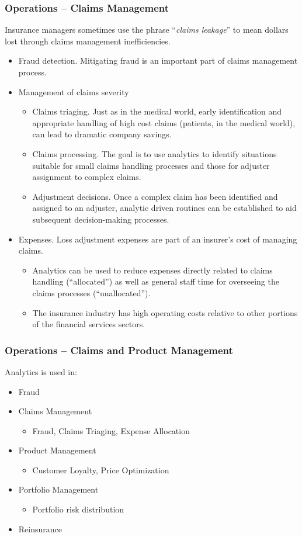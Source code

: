 \documentclass[serif,10pt]{beamer}
\begin{document}
\begin{frame}[shrink=2]
\frametitle{Operations -- Claims Management}
Insurance managers sometimes use the phrase ``\textit{claims leakage}'' to mean dollars lost through claims management inefficiencies.
\begin{itemize}
\item Fraud detection. Mitigating fraud is an important part of claims management process.
\item Management of claims severity
\begin{itemize}
\item Claims triaging. Just as in the medical world, early identification and appropriate handling of high cost claims (patients, in the medical world), can lead to dramatic company savings.
\item Claims processing. The goal is to use analytics to identify situations suitable for small claims handling processes and those for adjuster assignment to complex claims.
\item Adjustment decisions. Once a complex claim has been identified and assigned to an adjuster, analytic driven routines can be established to aid subsequent decision-making processes.
\end{itemize}
\item Expenses. Loss adjustment expenses are part of an insurer's cost of managing claims.
\begin{itemize}
\item Analytics can be used to reduce expenses directly related to claims handling (``allocated'') as well as general staff time for overseeing the claims processes (``unallocated'').
\item The insurance industry has high operating costs relative to other portions of the financial services sectors.
\end{itemize}
\end{itemize}
\end{frame}


\begin{frame}
\frametitle{Operations -- Claims and Product Management}
Analytics is used in:
  \begin{itemize}
\item Fraud
\item Claims Management
  \begin{itemize}
\item Fraud, Claims Triaging, Expense Allocation \end{itemize}
\item Product Management
  \begin{itemize}
\item Customer Loyalty, Price Optimization \end{itemize}
\item Portfolio Management
  \begin{itemize}
\item Portfolio risk distribution \end{itemize}
\item Reinsurance
\end{itemize}
\end{frame}
\end{document}
